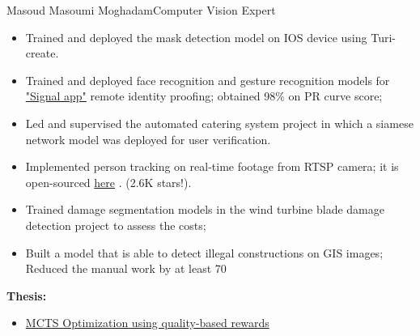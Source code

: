 \documentclass{article}
\begin{document}
\begin{cv}[avatar]{Masoud Masoumi Moghadam}{Computer Vision Expert}
\begin{cvevent}[10/2020][03/2021]
\begin{itemize}
        \item Trained and deployed the mask detection model on IOS device using Turi-create.\vspace{7pt}
        
    \end{itemize}
\end{cvevent}

\begin{cvevent}[11/2019][10/2020]
    \begin{itemize}
        \item Trained and deployed face recognition and gesture recognition models for \href{https://cafebazaar.ir/app/ir.part.app.signal}{"Signal app"} remote identity proofing; obtained 98\% on PR curve score; \vspace{7pt}
        
        \item Led and supervised the automated catering system project in which a siamese network model was deployed for user verification. \vspace{7pt}
        
        \item Implemented person tracking on real-time footage from RTSP camera; it is open-sourced \href{https://github.com/ZQPei/deep_sort_pytorch}{here} . (2.6K stars!).\vspace{7pt}
        
        \item Trained damage segmentation models in the wind turbine blade damage detection project to assess the costs;\vspace{7pt}

        \item Built a model that is able to detect illegal constructions on GIS images; Reduced the manual work by at least 70%
        
    \end{itemize}
\end{cvevent}



\begin{cvevent}[10/2020][03/2021] %
    \textbf{Thesis:}
    \begin{itemize}
        \item \href{https://github.com/masouduut94/MCTS-agent-python}{MCTS Optimization using quality-based rewards}\vspace{7pt}
    \end{itemize}
\end{cvevent}



\end{cv}
\end{document}
